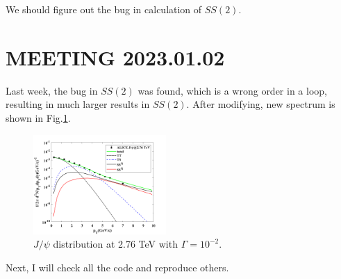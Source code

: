 \documentclass[twocolumn,aps,superscriptaddress,nofootinbib,floatfix]{revtex4}
\begin{document}
We should figure out the bug in calculation of $SS(2)$.

\section{MEETING 2023.01.02}
Last week, the bug in $SS(2)$ was found, which is a wrong order in a loop, resulting in much larger results in $SS(2)$. After modifying, new spectrum is shown in Fig.\ref{fig37}.
\begin{figure}[H]
	\includegraphics[width=0.45\textwidth]{Jpsi276_230101.png}
	\caption{$J/\psi$ distribution at 2.76 TeV with $\Gamma=10^{-2}$. }
	\label{fig37}
\end{figure}
Next, I will check all the code and reproduce others.
\end{document}
